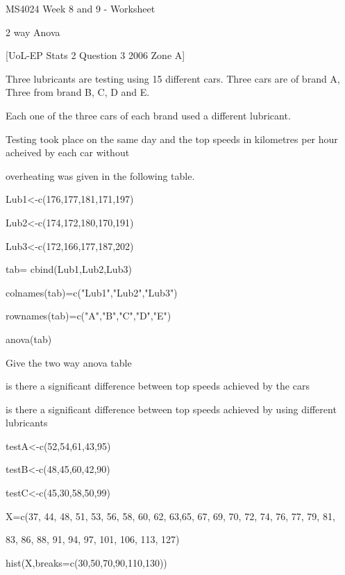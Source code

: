 
MS4024 Week 8 and 9 - Worksheet

2 way Anova


[UoL-EP Stats 2 Question 3 2006 Zone A]


Three lubricants are testing using 15 different cars. Three cars are of brand A, Three from brand B, C, D and E.


Each one of the three cars of each brand used a different lubricant.


Testing took place on the same day and the top speeds in kilometres per hour acheived by each car without

overheating was given in the following table.


Lub1<-c(176,177,181,171,197)

Lub2<-c(174,172,180,170,191)

Lub3<-c(172,166,177,187,202)


tab= cbind(Lub1,Lub2,Lub3)

colnames(tab)=c("Lub1","Lub2","Lub3")

rownames(tab)=c("A","B","C","D","E")


anova(tab)


Give the two way anova table

is there a significant difference between top speeds achieved by the cars

is there a significant difference between top speeds achieved by using different lubricants




testA<-c(52,54,61,43,95)

testB<-c(48,45,60,42,90)

testC<-c(45,30,58,50,99)



 

X=c(37, 44, 48, 51, 53, 56, 58, 60, 62, 63,65, 67, 69, 70, 72, 74, 76, 77, 79, 81,

83, 86, 88, 91, 94, 97, 101, 106, 113, 127)


hist(X,breaks=c(30,50,70,90,110,130))

 


